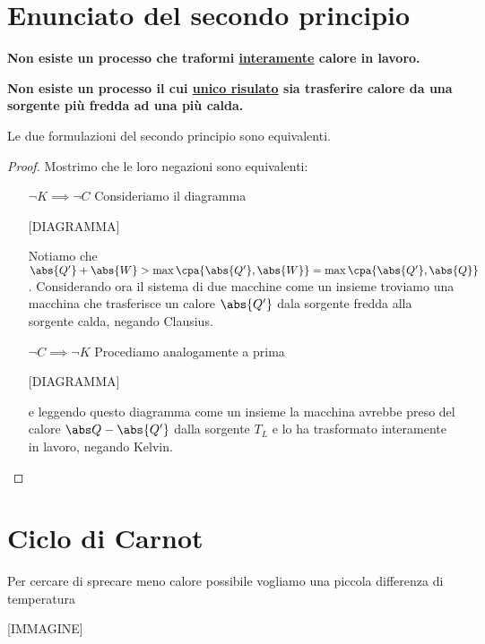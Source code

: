 \section{Enunciato del secondo principio}
\begin{fact}
\textbf{Non esiste un processo che traformi \ul{interamente} calore in lavoro.}
\end{fact}

\begin{fact}
\textbf{Non esiste un processo il cui \ul{unico risulato} sia trasferire calore da una sorgente pi\`u fredda ad una pi\`u calda.}
\end{fact}

\begin{proposition}
Le due formulazioni del secondo principio sono equivalenti.
\end{proposition}
\begin{proof}
Mostrimo che le loro negazioni sono equivalenti:
\setlength{\leftmargini}{0cm}
\begin{itemize}
\item[$\boxed{\neg K\implies \neg C}$] Consideriamo il diagramma

[DIAGRAMMA]

Notiamo che $\abs{Q'}+\abs{W}>\max{\cpa{\abs{Q'},\abs{W}}}=\max{\cpa{\abs{Q'},\abs{Q}}}$. Considerando ora il sistema di due macchine come un insieme troviamo una macchina che trasferisce un calore $\abs{Q'}$ dala sorgente fredda alla sorgente calda, negando Clausius.
\item[$\boxed{\neg C\implies \neg K}$] Procediamo analogamente a prima

[DIAGRAMMA]

e leggendo questo diagramma come un insieme la macchina avrebbe preso del calore $\abs Q-\abs{Q'}$ dalla sorgente $T_L$ e lo ha trasformato interamente in lavoro, negando Kelvin.
\end{itemize}
\setlength{\leftmargini}{0.5cm}
\end{proof}

\section{Ciclo di Carnot}
Per cercare di sprecare meno calore possibile vogliamo una piccola differenza di temperatura

[IMMAGINE]

